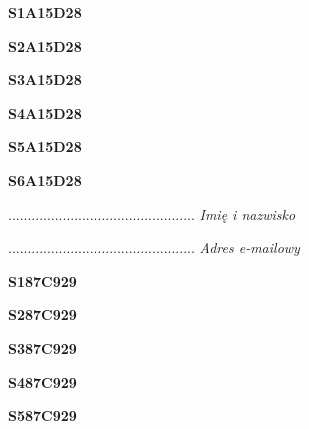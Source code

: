 \begin{turn}{90}\huge \textbf{S1A15D28}\end{turn}

\begin{turn}{90}\huge \textbf{S2A15D28}\end{turn}

\begin{turn}{90}\huge \textbf{S3A15D28}\end{turn}

\begin{turn}{90}\huge \textbf{S4A15D28}\end{turn}

\begin{turn}{90}\huge \textbf{S5A15D28}\end{turn}

\begin{turn}{90}\huge \textbf{S6A15D28}\end{turn}

\begin{turn}{90}\begin{minipage}{\linewidth} \vspace{20mm} ................................................  \textit{Imię i nazwisko}\end{minipage}\end{turn}

\begin{turn}{90}\begin{minipage}{\linewidth} \vspace{20mm} ................................................  \textit{Adres e-mailowy}\end{minipage}\end{turn}

\begin{turn}{90}\huge \textbf{S187C929}\end{turn}

\begin{turn}{90}\huge \textbf{S287C929}\end{turn}

\begin{turn}{90}\huge \textbf{S387C929}\end{turn}

\begin{turn}{90}\huge \textbf{S487C929}\end{turn}

\begin{turn}{90}\huge \textbf{S587C929}\end{turn}

